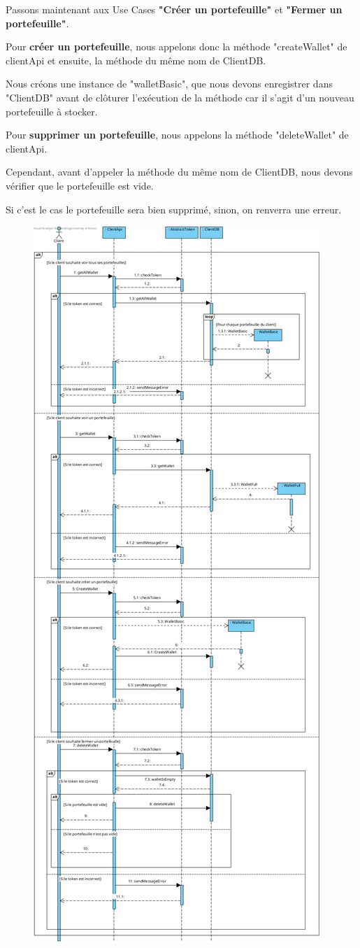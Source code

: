 \begin{flushleft}
Passons maintenant aux Use Cases \textbf{"Créer un portefeuille"} et \textbf{"Fermer un portefeuille"}.
\end{flushleft}

\begin{flushleft}
Pour \textbf{créer un portefeuille}, nous appelons donc la méthode "createWallet" de clientApi et ensuite, la méthode du même nom de ClientDB.
\end{flushleft}

\begin{flushleft}
Nous créons une instance de "walletBasic", que nous devons enregistrer dans "ClientDB" avant de clôturer l'exécution de la méthode car il s'agit d'un nouveau portefeuille à stocker.
\end{flushleft}

\begin{flushleft}
Pour \textbf{supprimer un portefeuille}, nous appelons la méthode "deleteWallet" de clientApi.
\end{flushleft}
\begin{flushleft}
Cependant, avant d'appeler la méthode du même nom de ClientDB, nous devons vérifier que le portefeuille est vide.
\end{flushleft}
\begin{flushleft}
Si c'est le cas le portefeuille sera bien supprimé, sinon, on renverra une erreur.
\end{flushleft}

\newpage
\begin{figure}[h]
\centering
\includegraphics[height = 1.2\textwidth]{Base/sequence/img/client/Voir les portefeuilles.png}
\end{figure}
\newpage

